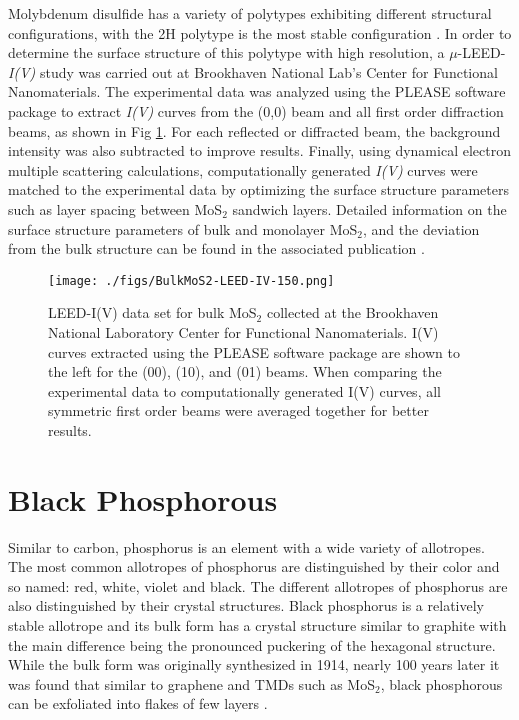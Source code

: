 Molybdenum disulfide has a variety of polytypes exhibiting different structural configurations, with the 2H polytype is the most stable configuration \cite{mos2-surfsci}. In order to determine the surface structure of this polytype with high resolution, a $\mu$-LEED-\textit{I(V)} study was carried out at Brookhaven National Lab's Center for Functional Nanomaterials. The experimental data was analyzed using the PLEASE software package to extract \textit{I(V)} curves from the (0,0) beam and all first order diffraction beams, as shown in Fig \ref{fig:BulkMoS2}. For each reflected or diffracted beam, the background intensity was also subtracted to improve results. Finally, using dynamical electron multiple scattering calculations, computationally generated \textit{I(V)} curves were matched to the experimental data by optimizing the surface structure parameters such as layer spacing between MoS$_2$ sandwich layers. Detailed information on the surface structure parameters of bulk and monolayer MoS$_2$, and the deviation from the bulk structure can be found in the associated publication \cite{mos2-surfsci}.

\begin{figure}
    \texttt{[image: ./figs/BulkMoS2-LEED-IV-150.png]}
    \caption{LEED-I(V) data set for bulk MoS$_2$ collected at the Brookhaven National Laboratory Center for Functional Nanomaterials. I(V) curves extracted using the PLEASE software package are shown to the left for the (00), (10), and (01) beams. When comparing the experimental data to computationally generated I(V) curves, all symmetric first order beams were averaged together for better results.
    }
    \label{fig:BulkMoS2}
\end{figure}

\section{Black Phosphorous}
Similar to carbon, phosphorus is an element with a wide variety of allotropes. The most common allotropes of phosphorus are distinguished by their color and so named: red, white, violet and black. The different allotropes of phosphorus are also distinguished by their crystal structures. Black phosphorus is a relatively stable allotrope and its bulk form has a crystal structure similar to graphite with the main difference being the pronounced puckering of the hexagonal structure. While the bulk form was originally synthesized in 1914, nearly 100 years later it was found that similar to graphene and TMDs such as MoS$_2$, black phosphorous can be exfoliated into flakes of few layers \cite{bp-ren}.


